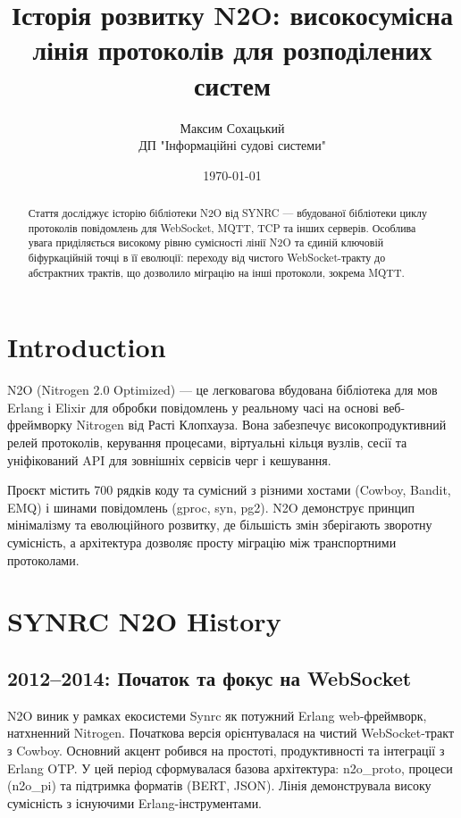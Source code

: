 \documentclass{article}
\title{Історія розвитку N2O: високосумісна лінія протоколів для розподілених систем}
\author{Максим Сохацький \\ ДП "Інформаційні судові системи"}
\date{\today}
\begin{document}
\maketitle

\begin{abstract}
Стаття досліджує історію бібліотеки N2O від SYNRC --- вбудованої бібліотеки циклу протоколів
повідомлень для WebSocket, MQTT, TCP та інших серверів. Особлива увага приділяється високому
рівню сумісності лінії N2O та єдиній ключовій біфуркаційній точці в її еволюції: переходу від
чистого WebSocket-тракту до абстрактних трактів, що дозволило міграцію на інші протоколи,
зокрема MQTT.
\end{abstract}

\tableofcontents

\section{Introduction}
N2O (Nitrogen 2.0 Optimized) --- це легковагова вбудована бібліотека для мов Erlang і Elixir для обробки
повідомлень у реальному часі на основі веб-фреймворку Nitrogen від Расті Клопхауза.
Вона забезпечує високопродуктивний релей протоколів, керування процесами, віртуальні кільця вузлів,
сесії та уніфікований API для зовнішніх сервісів черг і кешування.

Проєкт містить 700 рядків коду та сумісний з різними хостами (Cowboy, Bandit, EMQ) і шинами повідомлень (gproc, syn, pg2).
N2O демонструє принцип мінімалізму та еволюційного розвитку, де більшість змін зберігають зворотну сумісність,
а архітектура дозволяє просту міграцію між транспортними протоколами.

\section{SYNRC N2O History}

\subsection{2012--2014: Початок та фокус на WebSocket}
N2O виник у рамках екосистеми Synrc як потужний Erlang web-фреймворк, натхненний Nitrogen.
Початкова версія орієнтувалася на чистий WebSocket-тракт з Cowboy. Основний акцент робився
на простоті, продуктивності та інтеграції з Erlang OTP. У цей період сформувалася базова
архітектура: n2o\_proto, процеси (n2o\_pi) та підтримка форматів (BERT, JSON). Лінія
демонструвала високу сумісність з існуючими Erlang-інструментами.
\end{document}
